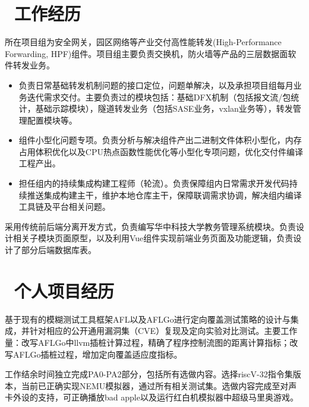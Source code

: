 \documentclass{resume}
\begin{document}
\section{\faUsers\ 工作经历}
所在项目组为安全网关，园区网络等产业交付高性能转发(High-Performance Forwarding, HPF)组件。项目组主要负责交换机，防火墙等产品的三层数据面软件转发业务。
\begin{itemize}
  \item 负责日常基础转发机制问题的接口定位，问题单解决，以及承担项目组每月业务迭代需求交付。主要负责过的模块包括：基础DFX机制（包括报文流/包统计，基础示踪模块），隧道转发业务（包括SASE业务，vxlan业务等），转发管理配置模块等。
  \item 组件小型化问题专项。负责分析与解决组件产出二进制文件体积小型化，内存占用体积优化以及CPU热点函数性能优化等小型化专项问题，优化交付件编译工程产出。
  \item 担任组内的持续集成构建工程师（轮流）。负责保障组内日常需求开发代码持续推送集成构建主干，维护本地仓库主干，保障联调需求协调，解决组内编译工具链及平台相关问题。
\end{itemize}

采用传统前后端分离开发方式，负责编写华中科技大学教务管理系统模块。负责设计相关子模块页面原型，以及利用Vue组件实现前端业务页面及功能逻辑，负责设计了部分后端数据库表。


\section{\faCogs\ 个人项目经历}
基于现有的模糊测试工具框架AFL以及AFLGo进行定向覆盖测试策略的设计与集成，并针对相应的公开通用漏洞集（CVE）复现及定向实验对比测试。主要工作量：改写AFLGo中llvm插桩计算过程，精确了程序控制流图的距离计算指标；改写AFLGo插桩过程，增加定向覆盖适应度指标。

工作结余时间独立完成PA0-PA2部分，包括所有选做内容。选择riscV-32指令集版本，当前已正确实现NEMU模拟器，通过所有相关测试集。选做内容完成至对声卡外设的支持，可正确播放bad apple以及运行红白机模拟器中超级马里奥游戏。
\end{document}

